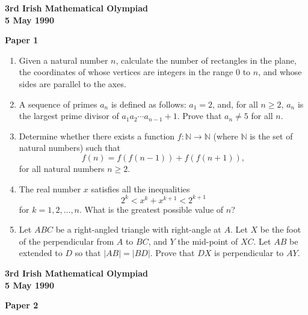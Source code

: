 \documentclass[12pt]{article}
\begin{document}
\begin{center}
{\large\bfseries 3rd Irish Mathematical Olympiad\\
5 May 1990}
\end{center}

\bigskip
\noindent\textbf{Paper 1}
\bigskip

\begin{enumerate}
\item Given a natural number $n$, calculate the number of rectangles in the plane, the coordinates of whose vertices are integers in the range 0 to $n$, and whose sides are parallel to the axes.

\item A sequence of primes $a_n$ is defined as follows: $a_1 = 2$, and, for all $n \ge 2$, $a_n$ is the largest prime divisor of $a_1a_2\cdots a_{n-1} + 1$. Prove that $a_n \ne 5$ for all $n$.

\item Determine whether there exists a function $f : \mathbb{N} \to \mathbb{N}$ (where $\mathbb{N}$ is the set of natural numbers) such that \[f(n) = f(f(n-1)) + f(f(n+1)),\] for all natural numbers $n \ge 2$.

\item The real number $x$ satisfies all the inequalities \[2^k < x^k + x^{k+1} < 2^{k+1}\] for $k = 1, 2, \ldots, n$. What is the greatest possible value of $n$?

\item Let $ABC$ be a right-angled triangle with right-angle at $A$. Let $X$ be the foot of the perpendicular from $A$ to $BC$, and $Y$ the mid-point of $XC$. Let $AB$ be extended to $D$ so that $|AB| = |BD|$. Prove that $DX$ is perpendicular to $AY$.

\end{enumerate}

\newpage

\begin{center}
{\large\bfseries 3rd Irish Mathematical Olympiad\\
5 May 1990}
\end{center}

\bigskip
\noindent\textbf{Paper 2}
\bigskip
\end{document}

